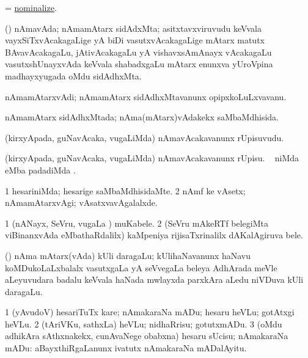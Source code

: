 \bentry
{}
\gl{\sakirx}
\bmng
= \hyperlink{nominalize}{nominalize}. 
\emng
\eentry

\bentry
{}
\gl{\nA}
\bmng
(\tashA) nAmavAda; nAmamAtarx sidAdxMta; asitxtavxviruvudu keVvala vayxSiTxvAcakagaLige yA biDi vasutxvAcakagaLige mAtarx matutx BAvavAcakagaLu, jAtivAcakagaLu yA vishavxsAmAnayx vAcakagaLu vasutxshUnayxvAda keVvala shabadxgaLu mAtarx enunxva yUroVpina madhayxyugada oMdu sidAdhxMta. 
\emng
\eentry

\bentry
{}
\gl{\nA}
\bmng
nAmamAtarxvAdi; nAmamAtarx sidAdhxMtavanunx opipxkoLuLxvavanu. 
\emng
\eentry

\bentry
{}
\gl{\gu}
\bmng
nAmamAtarx sidAdhxMtada; nAma(mAtarx)vAdakekx saMbaMdhisida. 
\emng
\eentry

\bentry
{}
\gl{\nA}
\bmng
(kirxyApada, guNavAcaka, \mo vugaLiMda) nAmavAcakavanunx rUpisuvudu. 
\emng
\eentry

\bentry
{}
\gl{\sakirx}
\bmng
(kirxyApada, guNavAcaka, \mo vugaLiMda) nAmavAcakavanunx rUpisu. \udA\  niMda  eMba padadiMda . 
\emng
\eentry

\bentry
{}
\gl{\kirxvi}
\bmng
\bnum
\num{1} hesariniMda; hesarige saMbaMdhisidaMte. 
\num{2} nAmf ke vAsetx; nAmamAtarxvAgi; vAsatxvavAgalalxde. 
\enum
\emng
\eentry

\bentry
{}
\gl{\nA}
\bmng
\bnum
\num{1} (nANayx, SeVru, \mo vugaLa \vi) muKabele. 
\num{2} (SeVru \vi mAkeRTf belegiMta viBinanxvAda eMbathaRdalilx) kaMpeniya rijisaTxrinalilx dAKalAgiruva bele. 
\enum
\emng
\eentry

\bentry
{}
\gl{\nA}
\bmng
(\athaRshA) nAma mAtarx(vAda) kUli daragaLu; kUlihaNavanunx haNavu koMDukoLaLxbalalx vasutxgaLa yA seVvegaLa beleya AdhArada meVle aLeyuvudara badalu keVvala haNada mwlayxda parxkAra aLedu niVDuva kUli daragaLu. 
\emng
\eentry

\bentry
{}
\gl{\sakirx}
\bmng
\bnum
\num{1} (yAvudoV) hesariTuTx kare; nAmakaraNa mADu; hesaru heVLu; gotAtxgi heVLu. 
\num{2} (tAriVKu, sathxLa) heVLu; nidhaRrisu; gotutxmADu. 
\num{3} (oMdu adhikAra sAthxnakekx, cunAvaNege obabxna) hesaru sUcisu; nAmakaraNa mADu:  aBayxthiRgaLanunx ivatutx nAmakaraNa mADalAyitu. 
\enum
\emng
\eentry

